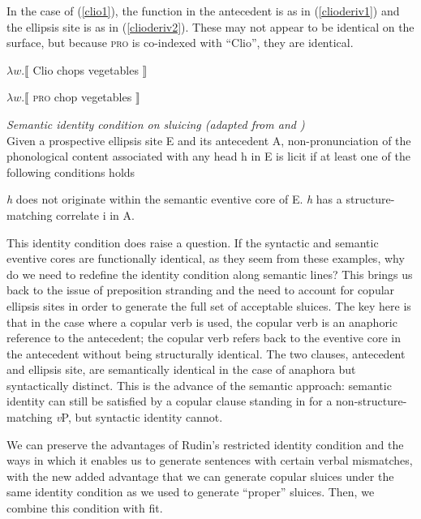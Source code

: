 \documentclass{turabian-researchpaper}
\begin{document}
In the case of (\ref{clio1}), the function in the antecedent is as in (\ref{clioderiv1}) and the ellipsis site is as in (\ref{clioderiv2}). These may not appear to be identical on the surface, but because \textsc{pro} is co-indexed with ``Clio'', they are identical. 

\begin{exe}
\ex\label{clioderiv1} $\lambda w.\llbracket$ Clio chops vegetables $\rrbracket$
\end{exe}

\begin{exe}
\ex\label{clioderiv2} $\lambda w.\llbracket$ \textsc{pro} chop vegetables $\rrbracket$
\end{exe}

\begin{exe}
\ex\label{idcondonsluicing1} \textit{Semantic identity condition on sluicing (adapted from \citealt{rudin} and \citealp*{hardtrudin})}\\
Given a prospective ellipsis site E and its antecedent A, non-pronunciation of the phonological content associated with any head h in E is licit if at least one of the following conditions holds
\begin{xlist}
\ex \textit{h} does not originate within the semantic eventive core of E.
\ex \textit{h} has a structure-matching correlate i in A.
\end{xlist}
\end{exe}
This identity condition does raise a question. If the syntactic and semantic eventive cores are functionally identical, as they seem from these examples, why do we need to redefine the identity condition along semantic lines? This brings us back to the issue of preposition stranding and the need to account for copular ellipsis sites in order to generate the full set of acceptable sluices. The key here is that in the case where a copular verb is used, the copular verb is an anaphoric reference to the antecedent; the copular verb refers back to the eventive core in the antecedent without being structurally identical. The two clauses, antecedent and ellipsis site, are semantically identical in the case of anaphora but syntactically distinct. This is the advance of the semantic approach: semantic identity can still be satisfied by a copular clause standing in for a non-structure-matching \textit{v}P, but syntactic identity cannot. 

We can preserve the advantages of Rudin's restricted identity condition and the ways in which it enables us to generate sentences with certain verbal mismatches, with the new added advantage that we can generate copular sluices under the same identity condition as we used to generate ``proper'' sluices. Then, we combine this condition with fit. 
\end{document}
